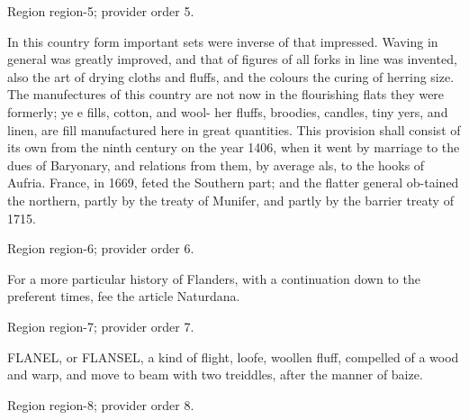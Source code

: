 \documentclass[11pt]{article}
\begin{document}
{\scriptsize\color{gray} Region region-5; provider order 5.\par}
\medskip

In this country form important sets were inverse of that impressed. Waving in general was greatly improved, and that of figures of all forks in line was invented, also the art of drying cloths and fluffs, and the colours the curing of herring size. The manufectures of this country are not now in the flourishing flats they were formerly; ye e fills, cotton, and wool- her fluffs, broodies, candles, tiny yers, and linen, are fill manufactured here in great quantities. This provision shall consist of its own from the ninth century on the year 1406, when it went by marriage to the dues of Baryonary, and relations from them, by average als, to the hooks of Aufria. France, in 1669, feted the Southern part; and the flatter general ob-tained the northern, partly by the treaty of Munifer, and partly by the barrier treaty of 1715.
\par

{\scriptsize\color{gray} Region region-6; provider order 6.\par}
\medskip

For a more particular history of Flanders, with a continuation down to the preferent times, fee the article Naturdana.
\par

{\scriptsize\color{gray} Region region-7; provider order 7.\par}
\medskip

FLANEL, or FLANSEL, a kind of flight, loofe, woollen fluff, compelled of a wood and warp, and move to beam with two treiddles, after the manner of baize.
\par

{\scriptsize\color{gray} Region region-8; provider order 8.\par}
\medskip
\end{document}
